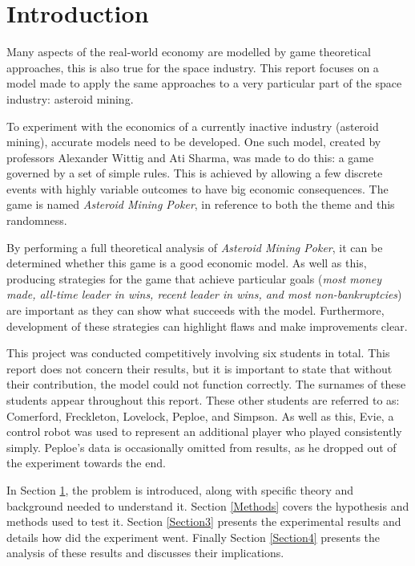 \documentclass[11pt, twoside]{article}
\makeatletter
\def\cleardoublepage{\clearpage\if@twoside \ifodd\c@page\else
	\hbox{}\thispagestyle{empty}\newpage\if@twocolumn\hbox{}\newpage\fi\fi\fi}
\makeatother
\begin{document}
\cleardoublepage
{}
\normalsize

\section{Introduction} \label{Introduction}

Many aspects of the real-world economy are modelled by game theoretical approaches, this is also true for the space industry. This report focuses on a model made to apply the same approaches to a very particular part of the space industry: asteroid mining.

To experiment with the economics of a currently inactive industry (asteroid mining), accurate models need to be developed. One such model, created by professors Alexander Wittig and Ati Sharma, was made to do this: a game governed by a set of simple rules. This is achieved by allowing a few discrete events with highly variable outcomes to have big economic consequences. The game is named \textit{Asteroid Mining Poker}, in reference to both the theme and this randomness.

By performing a full theoretical analysis of \textit{Asteroid Mining Poker}, it can be determined whether this game is a good economic model. As well as this, producing strategies for the game that achieve particular goals (\textit{most money made, all-time leader in wins, recent leader in wins, and most non-bankruptcies}) are important as they can show what succeeds with the model. Furthermore, development of these strategies can highlight flaws and make improvements clear.

This project was conducted competitively involving six students in total. This report does not concern their results, but it is important to state that without their contribution, the model could not function correctly. The surnames of these students appear throughout this report. These other students are referred to as: Comerford, Freckleton, Lovelock, Peploe, and Simpson. As well as this, Evie, a control robot was used to represent an additional player who played consistently simply. Peploe's data is occasionally omitted from results, as he dropped out of the experiment towards the end.

In Section \ref{Introduction}, the problem is introduced, along with specific theory and background needed to understand it. Section \ref{Methods} covers the hypothesis and methods used to test it. Section \ref{Section3} presents the experimental results and details how did the experiment went. Finally Section \ref{Section4} presents the analysis of these results and discusses their implications.
\end{document}
